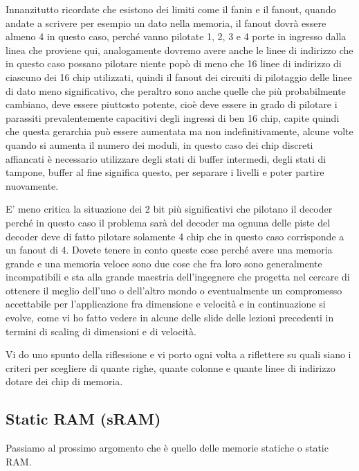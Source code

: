 Innanzitutto ricordate che esistono dei limiti come il fanin e il fanout, quando andate a scrivere per esempio un dato nella memoria, il fanout dovrà essere almeno 4 in questo caso, perché vanno pilotate 1, 2, 3 e 4 porte in ingresso dalla linea che proviene qui, analogamente dovremo avere anche le linee di indirizzo che in questo caso possano pilotare niente popò di meno che 16 linee di indirizzo di ciascuno dei 16 chip utilizzati, quindi il fanout dei circuiti di pilotaggio delle linee di dato meno significativo, che peraltro sono anche quelle che più probabilmente cambiano, deve essere piuttosto potente, cioè deve essere in grado di pilotare i parassiti prevalentemente capacitivi degli ingressi di ben 16 chip, capite quindi che questa gerarchia può essere aumentata ma non indefinitivamente, alcune volte quando si aumenta il numero dei moduli, in questo caso dei chip discreti affiancati è necessario utilizzare degli stati di buffer intermedi, degli stati di tampone, buffer al fine significa questo, per separare i livelli e poter partire nuovamente.

E' meno critica la situazione dei 2 bit più significativi che pilotano il decoder perché in questo caso il problema sarà del decoder ma ognuna delle piste del decoder deve di fatto pilotare solamente 4 chip che in questo caso corrisponde a un fanout di 4.
Dovete tenere in conto queste cose perché avere una memoria grande e una memoria veloce sono due cose che fra loro sono generalmente incompatibili e sta alla grande maestria dell'ingegnere che progetta nel cercare di ottenere il meglio dell'uno o dell'altro mondo o eventualmente un compromesso accettabile per l'applicazione fra dimensione e velocità e in continuazione si evolve, come vi ho fatto vedere in alcune delle slide delle lezioni precedenti in termini di scaling di dimensioni e di velocità.

Vi do uno spunto della riflessione e vi porto ogni volta a riflettere su quali siano i criteri per scegliere di quante righe, quante colonne e quante linee di indirizzo dotare dei chip di memoria.

\subsection{Static RAM (sRAM)}

Passiamo al prossimo argomento che è quello delle memorie statiche o static RAM.

